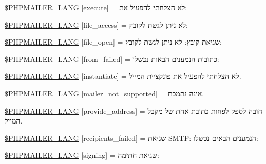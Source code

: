 \begin{DoxyCompactItemize}
\hyperlink{phpmailer_8lang-he_8php_a668217a9563a168f30f2a8548b6ed5a9}{\$\+P\+H\+P\+M\+A\+I\+L\+E\+R\+\_\+\+L\+A\+NG} \mbox{[}\textquotesingle{}execute\textquotesingle{}\mbox{]} = \textquotesingle{}לא הצלחתי להפעיל את\+: \textquotesingle{}
\item 
\hyperlink{phpmailer_8lang-he_8php_a7e83349023b856ef9e5c46e30ae6d51e}{\$\+P\+H\+P\+M\+A\+I\+L\+E\+R\+\_\+\+L\+A\+NG} \mbox{[}\textquotesingle{}file\+\_\+access\textquotesingle{}\mbox{]} = \textquotesingle{}לא ניתן לגשת לקובץ\+: \textquotesingle{}
\item 
\hyperlink{phpmailer_8lang-he_8php_a28d1a6517bf4c942a0ddd506188ad2e0}{\$\+P\+H\+P\+M\+A\+I\+L\+E\+R\+\_\+\+L\+A\+NG} \mbox{[}\textquotesingle{}file\+\_\+open\textquotesingle{}\mbox{]} = \textquotesingle{}שגיאת קובץ\+: לא ניתן לגשת לקובץ\+: \textquotesingle{}
\item 
\hyperlink{phpmailer_8lang-he_8php_adf832ae12155a09be077c6d5e4fd7e22}{\$\+P\+H\+P\+M\+A\+I\+L\+E\+R\+\_\+\+L\+A\+NG} \mbox{[}\textquotesingle{}from\+\_\+failed\textquotesingle{}\mbox{]} = \textquotesingle{}כתובות הנמענים הבאות נכשלו\+: \textquotesingle{}
\item 
\hyperlink{phpmailer_8lang-he_8php_ad58dde16780f4770ccf4dd282ea1f5ad}{\$\+P\+H\+P\+M\+A\+I\+L\+E\+R\+\_\+\+L\+A\+NG} \mbox{[}\textquotesingle{}instantiate\textquotesingle{}\mbox{]} = \textquotesingle{}לא הצלחתי להפעיל את פונקציית המייל.\textquotesingle{}
\item 
\hyperlink{phpmailer_8lang-he_8php_aa2ebcb8833ee83a7ad67401c4bb3a6ad}{\$\+P\+H\+P\+M\+A\+I\+L\+E\+R\+\_\+\+L\+A\+NG} \mbox{[}\textquotesingle{}mailer\+\_\+not\+\_\+supported\textquotesingle{}\mbox{]} = \textquotesingle{} אינה נתמכת.\textquotesingle{}
\item 
\hyperlink{phpmailer_8lang-he_8php_a8b97897c2406b7392b056f375feeefbb}{\$\+P\+H\+P\+M\+A\+I\+L\+E\+R\+\_\+\+L\+A\+NG} \mbox{[}\textquotesingle{}provide\+\_\+address\textquotesingle{}\mbox{]} = \textquotesingle{}חובה לספק לפחות כתובת אחת של מקבל המייל.\textquotesingle{}
\item 
\hyperlink{phpmailer_8lang-he_8php_a7589d30bb9b368327c2df015f3e6bcba}{\$\+P\+H\+P\+M\+A\+I\+L\+E\+R\+\_\+\+L\+A\+NG} \mbox{[}\textquotesingle{}recipients\+\_\+failed\textquotesingle{}\mbox{]} = \textquotesingle{}שגיאת S\+M\+T\+P\+: הנמענים הבאים נכשלו\+: \textquotesingle{}
\item 
\hyperlink{phpmailer_8lang-he_8php_a68e437bdb9b968a5a67320f03d231565}{\$\+P\+H\+P\+M\+A\+I\+L\+E\+R\+\_\+\+L\+A\+NG} \mbox{[}\textquotesingle{}signing\textquotesingle{}\mbox{]} = \textquotesingle{}שגיאת חתימה\+: \textquotesingle{}

\end{DoxyCompactItemize}
